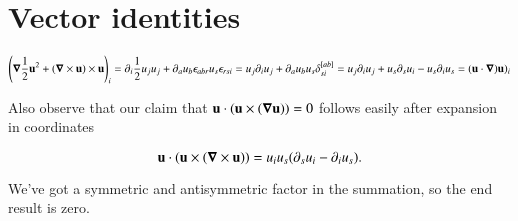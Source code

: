 \label{chap:appendix:constantSpinSurfaces}
\section{Vector identities}


\begin{dmath}\label{eqn:constantSpinSurfaces:170}
\left( \spacegrad \inv{2} \Bu^2 + (\spacegrad \cross \Bu) \cross \Bu \right)_i
=
\partial_i \inv{2} u_j u_j + \partial_a u_b \epsilon_{a b r} u_s \epsilon_{r s i} 
=
u_j \partial_i u_j + \partial_a u_b u_s \delta^{[a b]}_{s i} 
=
u_j \partial_i u_j 
+ u_s \partial_s u_i 
- u_s \partial_i u_s 
= (\Bu \cdot \spacegrad) \Bu)_i
\end{dmath}

Also observe that our claim that $\mathbf{u} \cdot (\mathbf{u} \times (\boldsymbol{\nabla} \mathbf{u})) = 0$ follows easily after expansion in coordinates

\begin{equation}\label{eqn:constantSpinSurfaces:190}
\mathbf{u} \cdot (\mathbf{u} \times (\boldsymbol{\nabla} \times \mathbf{u}) )
=
u_i u_s ( \partial_s u_i - \partial_i u_s ).
\end{equation}

We've got a symmetric and antisymmetric factor in the summation, so the end result is zero.


